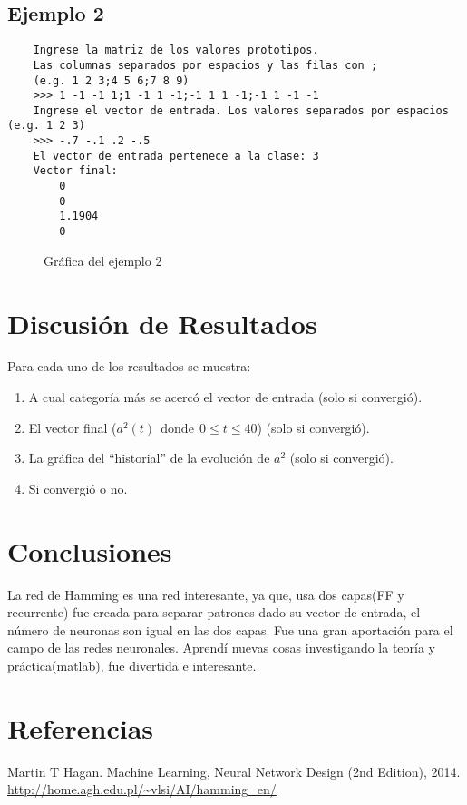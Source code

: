 \documentclass{article}
\begin{document}
\subsection{Ejemplo 2}
\begin{lstlisting}
	Ingrese la matriz de los valores prototipos. 
	Las columnas separados por espacios y las filas con ;  
	(e.g. 1 2 3;4 5 6;7 8 9)
	>>> 1 -1 -1 1;1 -1 1 -1;-1 1 1 -1;-1 1 -1 -1
	Ingrese el vector de entrada. Los valores separados por espacios (e.g. 1 2 3)
	>>> -.7 -.1 .2 -.5
	El vector de entrada pertenece a la clase: 3
	Vector final:
		0
		0
		1.1904
		0
\end{lstlisting}
\begin{figure}[htpb]
	\centering
	
	\caption{Gráfica del ejemplo 2}
\end{figure}
\newpage
\section{Discusión de Resultados}
Para cada uno de los resultados se muestra:
\begin{enumerate}
	\item A cual categoría más se acercó el vector de entrada (solo si convergió).
	\item El vector final ($a^2(t)\ \ \text{donde}\ \  0 \leq t \leq 40$) (solo si convergió).
	\item La gráfica del ``historial'' de la evolución de $a^2$ (solo si convergió).
	\item Si convergió o no.
\end{enumerate}
\section{Conclusiones}
La red de Hamming es una red interesante, ya que, usa dos capas(FF y recurrente) fue creada para separar patrones dado su vector de entrada, el número de neuronas son igual en las dos capas. Fue una gran aportación para el campo de las redes neuronales. Aprendí nuevas cosas investigando la teoría y práctica(matlab), fue divertida e interesante.
\section{Referencias}
Martin T Hagan. Machine Learning, Neural Network Design (2nd Edition), 2014.\\
\url{http://home.agh.edu.pl/~vlsi/AI/hamming_en/}
\end{document}
